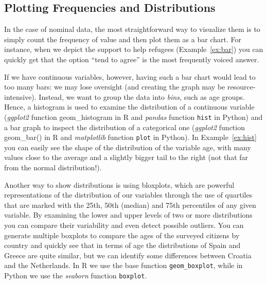 \subsection{Plotting Frequencies and Distributions}\label{sec:barplot}
In the case of nominal data, the most straightforward way to visualize them is to simply count the frequency of value and then plot them as a bar chart. For instance, when we depict the support to help refugees (Example~\ref{ex:bar}) you can quickly get that the option ``tend to agree'' is the most frequently voiced answer.


If we have continuous variables, however, having such a bar chart would lead to too many bars: we may lose oversight (and creating the graph may be resource-intensive). Instead, we want to group the data into \emph{bins}, such as age groups.
Hence, a histogram is used to examine the distribution of a continuous variable (\emph{ggplot2} function geom\_histogram in R and \emph{pandas} function \texttt{hist} in Python) and a bar graph to inspect the distribution of a categorical one (\emph{ggplot2} function geom\_bar() in R and \emph{matplotlib} function \texttt{plot} in Python). In Example~\ref{ex:hist} you can easily see the shape of the distribution of the variable age, with many values close to the average and a slightly bigger tail to the right (not that far from the normal distribution!).


Another way to show distributions is using bloxplots, which are powerful representations of the distribution of our variables through the use of quartiles that are marked with the 25th, 50th (median) and 75th percentiles of any given variable. By examining the lower and upper levels of two or more distributions you can compare their variability and even detect possible outliers. You can generate multiple boxplots to compare the ages of the surveyed citizens by country and quickly see that in terms of age the distributions of Spain and Greece are quite similar, but we can identify some differences between Croatia and the Netherlands. In R we use the base function \texttt{geom\_boxplot}, while in Python we use the \emph{seaborn} function \texttt{boxplot}.

